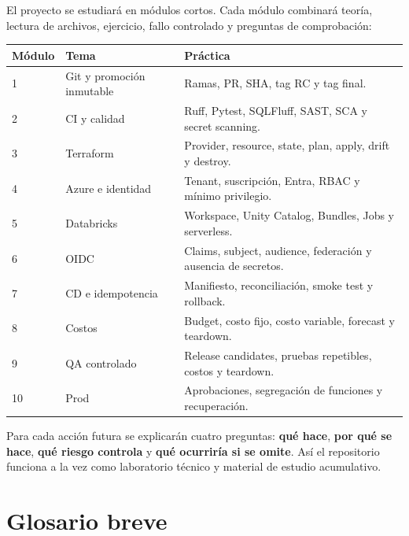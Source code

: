 \documentclass[11pt,a4paper]{article}
\begin{document}
El proyecto se estudiará en módulos cortos. Cada módulo combinará teoría, lectura de archivos,
ejercicio, fallo controlado y preguntas de comprobación:

\begin{longtable}{p{}p{}p{}}
\toprule
\textbf{Módulo} & \textbf{Tema} & \textbf{Práctica} \\
\midrule
\endhead
1 & Git y promoción inmutable & Ramas, PR, SHA, tag RC y tag final. \\
2 & CI y calidad & Ruff, Pytest, SQLFluff, SAST, SCA y secret scanning. \\
3 & Terraform & Provider, resource, state, plan, apply, drift y destroy. \\
4 & Azure e identidad & Tenant, suscripción, Entra, RBAC y mínimo privilegio. \\
5 & Databricks & Workspace, Unity Catalog, Bundles, Jobs y serverless. \\
6 & OIDC & Claims, subject, audience, federación y ausencia de secretos. \\
7 & CD e idempotencia & Manifiesto, reconciliación, smoke test y rollback. \\
8 & Costos & Budget, costo fijo, costo variable, forecast y teardown. \\
9 & QA controlado & Release candidates, pruebas repetibles, costos y teardown. \\
10 & Prod & Aprobaciones, segregación de funciones y recuperación. \\
\bottomrule
\end{longtable}

Para cada acción futura se explicarán cuatro preguntas: \textbf{qué hace}, \textbf{por qué se hace},
\textbf{qué riesgo controla} y \textbf{qué ocurriría si se omite}. Así el repositorio funciona a la vez
como laboratorio técnico y material de estudio acumulativo.

\section{Glosario breve}
\end{document}
